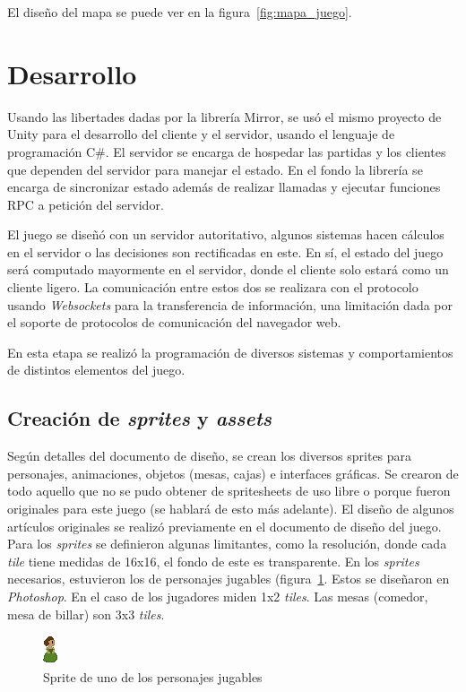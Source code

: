 El diseño del mapa se puede ver en la figura~\ref{fig:mapa_juego}.

\section{Desarrollo}
Usando las libertades dadas por la librería Mirror, se usó el mismo proyecto de Unity para el desarrollo del cliente y el servidor, usando el lenguaje de programación C\#. El servidor se encarga de hospedar las partidas y los clientes que dependen del servidor para manejar el estado. En el fondo la librería se encarga de sincronizar estado además de realizar llamadas y ejecutar funciones RPC a petición del servidor.

El juego se diseñó con un servidor autoritativo, algunos sistemas hacen cálculos en el servidor o las decisiones son rectificadas en este. En sí, el estado del juego será computado mayormente en el servidor, donde el cliente solo estará como un cliente ligero. La comunicación entre estos dos se realizara con el protocolo usando \textit{Websockets} para la transferencia de información, una limitación dada por el soporte de protocolos de comunicación del navegador web.

En esta etapa se realizó la programación de diversos sistemas y comportamientos de distintos elementos del juego.

\subsection{Creación de \textit{sprites} y \textit{assets}}
Según detalles del documento de diseño, se crean los diversos sprites para personajes, animaciones, objetos (mesas, cajas) e interfaces gráficas. Se crearon de todo aquello que no se pudo obtener de spritesheets de uso libre o porque fueron originales para este juego (se hablará de esto más adelante). El diseño de algunos artículos originales se realizó previamente en el documento de diseño del juego. Para los \textit{sprites} se definieron algunas limitantes, como la resolución, donde cada \textit{tile}  tiene medidas de 16x16, el fondo de este es transparente. En los \textit{sprites} necesarios, estuvieron los de personajes jugables (figura~\ref{fig:sprite_johanna}. Estos se diseñaron en \textit{Photoshop}. En el caso de los jugadores miden 1x2 \textit{tiles}. Las mesas (comedor, mesa de billar) son 3x3 \textit{tiles}. 

\begin{figure}[h]
    \centering
    \includegraphics[width=0.2\linewidth]{images/JohannaOrdonez.png}
    \caption{Sprite de uno de los personajes jugables}
    \label{fig:sprite_johanna}
\end{figure}

